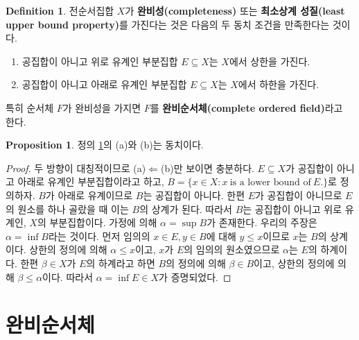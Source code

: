 \documentclass[11pt]{book}
\numberwithin{equation}{chapter}
\theoremstyle{definition}
\newtheorem{prop}[thm]{Proposition}
\newtheorem{defn}[thm]{Definition}
\begin{document}
    \begin{defn} \label{def 1.2.7}
        전순서집합 \(X\)가 \textbf{완비성(completeness)} 또는 \textbf{최소상계 성질(least upper bound property)}를 가진다는 것은 다음의 두 동치 조건을 만족한다는 것이다.
        \begin{enumerate} [label=(\alph*), leftmargin=2\parindent]
            \item 공집합이 아니고 위로 유계인 부분집합 \(E \subseteq X\)는 \(X\)에서 상한을 가진다.
            \item 공집합이 아니고 아래로 유계인 부분집합 \(E \subseteq X\)는 \(X\)에서 하한을 가진다.
        \end{enumerate}
        특히 순서체 \(F\)가 완비성을 가지면 \(F\)를 \textbf{완비순서체(complete ordered field)}라고 한다.
    \end{defn}

    \begin{prop}
        정의 \ref{def 1.2.7}의 (a)와 (b)는 동치이다.
    \end{prop}
    \begin{proof}
        두 방향이 대칭적이므로 (a)\(\Leftarrow\)(b)만 보이면 충분하다. \(E \subseteq X\)가 공집합이 아니고 아래로 유계인 부분집합이라고 하고, \(B = \{x \in X: x \ \text{is a lower bound of} \ E.\}\)로 정의하자. \(B\)가 아래로 유계이므로 \(B\)는 공집합이 아니다. 한편 \(E\)가 공집합이 아니므로 \(E\)의 원소를 하나 골랐을 때 이는 \(B\)의 상계가 된다. 따라서 \(B\)는 공집합이 아니고 위로 유계인, \(X\)의 부분집합이다. 가정에 의해 \(\alpha = \sup B\)가 존재한다. 우리의 주장은 \(\alpha = \inf B\)라는 것이다. 먼저 임의의 \(x \in E, y \in B\)에 대해 \(y \le x\)이므로 \(x\)는 \(B\)의 상계이다. 상한의 정의에 의해 \(\alpha \le x\)이고, \(x\)가 \(E\)의 임의의 원소였으므로 \(\alpha\)는 \(E\)의 하계이다. 한편 \(\beta \in X\)가 \(E\)의 하계라고 하면 \(B\)의 정의에 의해 \(\beta \in B\)이고, 상한의 정의에 의해 \(\beta \le \alpha\)이다. 따라서 \(\alpha = \inf E \in X\)가 증명되었다.
    \end{proof}

\section{완비순서체}
\end{document}
